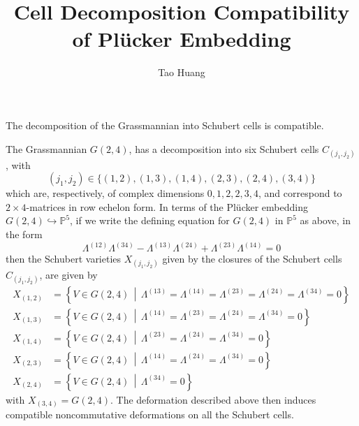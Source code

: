 \documentclass[11pt]{homework}
\title{Cell Decomposition Compatibility of Plücker Embedding}
\author{Tao Huang}
\begin{document}
\maketitle


The decomposition of the Grassmannian into Schubert cells is compatible. 

\begin{example}\cite[p.~124]{marcolli2017noncommutative}
    The Grassmannian $G(2, 4)$, has a decomposition into six Schubert cells $C_{\left(j_{1}, j_{2}\right)}$, with
    \begin{equation*}
        \left(j_{1}, j_{2}\right) \in\{(1,2),(1,3),(1,4),(2,3),(2,4),(3,4)\}
    \end{equation*}
    which are, respectively, of complex dimensions $0,1,2,2,3,4$, and correspond to $2 \times 4$-matrices in row echelon form. In terms of the Plücker embedding $G(2, 4) \hookrightarrow \mathbb{P}^{5}$, if we write the defining equation for $G(2, 4)$ in $\mathbb{P}^{5}$ as above, in the form
    \begin{equation*}
        \Lambda^{(12)} \Lambda^{(34)}-\Lambda^{(13)} \Lambda^{(24)}+\Lambda^{(23)} \Lambda^{(14)}=0
    \end{equation*}
    then the Schubert varieties $X_{\left(j_{1}, j_{2}\right)}$ given by the closures of the Schubert cells $C_{\left(j_{1}, j_{2}\right)}$, are given by
    \begin{align*}
        X_{(1,2)}&=\left\{V \in G(2, 4) \, \middle | \, \Lambda^{(13)}=\Lambda^{(14)}=\Lambda^{(23)}=\Lambda^{(24)}=\Lambda^{(34)}=0\right\} \\
        X_{(1,3)}&=\left\{V \in G(2, 4) \, \middle | \, \Lambda^{(14)}=\Lambda^{(23)}=\Lambda^{(24)}=\Lambda^{(34)}=0\right\} \\
        X_{(1,4)}&=\left\{V \in G(2, 4) \, \middle | \, \Lambda^{(23)}=\Lambda^{(24)}=\Lambda^{(34)}=0\right\} \\
        X_{(2,3)}&=\left\{V \in G(2, 4) \, \middle | \, \Lambda^{(14)}=\Lambda^{(24)}=\Lambda^{(34)}=0\right\} \\
        X_{(2,4)}&=\left\{V \in G(2, 4) \, \middle | \, \Lambda^{(34)}=0\right\}
    \end{align*}
    with $X_{(3,4)}=G(2, 4) .$ The deformation described above then induces compatible noncommutative deformations on all the Schubert cells. 
\end{example}


\end{document}
